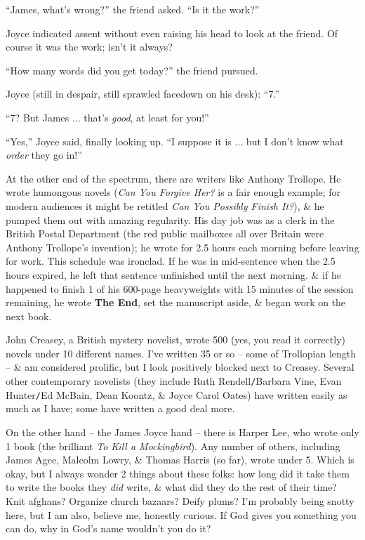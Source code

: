 \documentclass{article}
\numberwithin{equation}{section}
\begin{document}
``James, what's wrong?'' the friend asked. ``Is it the work?''

Joyce indicated assent without even raising his head to look at the friend. Of course it was the work; isn't it always?

``How many words did you get today?'' the friend pursued.

Joyce (still in despair, still sprawled facedown on his desk): ``7.''

``7? But James $\ldots$ that's \textit{good}, at least for you!''

``Yes,'' Joyce said, finally looking up. ``I suppose it is $\ldots$ but I don't know what \textit{order} they go in!''

At the other end of the spectrum, there are writers like Anthony Trollope. He wrote humongous novels (\textit{Can You Forgive Her?} is a fair enough example; for modern audiences it might be retitled \textit{Can You Possibly Finish It?}), \& he pumped them out with amazing regularity. His day job was as a clerk in the British Postal Department (the red public mailboxes all over Britain were Anthony Trollope's invention); he wrote for 2.5 hours each morning before leaving for work. This schedule was ironclad. If he was in mid-sentence when the 2.5 hours expired, he left that sentence unfinished until the next morning. \& if he happened to finish 1 of his 600-page heavyweights with 15 minutes of the session remaining, he wrote \textbf{The End}, set the manuscript aside, \& began work on the next book.

John Creasey, a British mystery novelist, wrote 500 (yes, you read it correctly) novels under 10 different names. I've written 35 or so -- some of Trollopian length -- \& am considered prolific, but I look positively blocked next to Creasey. Several other contemporary novelists (they include Ruth Rendell{\tt/}Barbara Vine, Evan Hunter{\tt/}Ed McBain, Dean Koontz, \& Joyce Carol Oates) have written easily as much as I have; some have written a good deal more.

On the other hand -- the James Joyce hand -- there is Harper Lee, who wrote only 1 book (the brilliant \textit{To Kill a Mockingbird}). Any number of others, including James Agee, Malcolm Lowry, \& Thomas Harris (so far), wrote under 5. Which is okay, but I always wonder 2 things about these folks: how long did it take them to write the books they \textit{did} write, \& what did they do the rest of their time? Knit afghans? Organize church bazaars? Deify plums? I'm probably being snotty here, but I am also, believe me, honestly curious. If God gives you something you can do, why in God's name wouldn't you do it?
\end{document}
